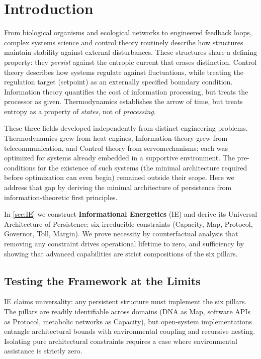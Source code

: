 \section{Introduction}
From biological organisms and ecological networks to engineered feedback loops, complex systems science and control theory routinely describe how structures maintain stability against external disturbances. These structures share a defining property: they \textit{persist} against the entropic current that erases distinction. Control theory describes how systems regulate against fluctuations, while treating the regulation target (setpoint) as an externally specified boundary condition. Information theory quantifies the cost of information processing, but treats the processor as given. Thermodynamics establishes the arrow of time, but treats entropy as a property of \emph{states}, not of \emph{processing}.

These three fields developed independently from distinct engineering problems. Thermodynamics grew from heat engines, Information theory grew from telecommunication, and Control theory from servomechanisms; each was optimized for systems already embedded in a supportive environment. The pre-conditions for the existence of such systems (the minimal architecture required before optimization can even begin) remained outside their scope. Here we address that gap by deriving the minimal architecture of persistence from information-theoretic first principles.

In \cref{sec:IE} we construct \textbf{Informational Energetics} (IE) and derive its Universal Architecture of Persistence: six irreducible constraints (Capacity, Map, Protocol, Governor, Toll, Margin). We prove necessity by counterfactual analysis that removing any constraint drives operational lifetime to zero, and sufficiency by showing that advanced capabilities are strict compositions of the six pillars.

\subsection{Testing the Framework at the Limits}
IE claims universality: any persistent structure must implement the six pillars. The pillars are readily identifiable across domains (DNA as Map, software APIs as Protocol, metabolic networks as Capacity), but open-system implementations entangle architectural bounds with environmental coupling and recursive nesting. Isolating pure architectural constraints requires a case where environmental assistance is strictly zero.

